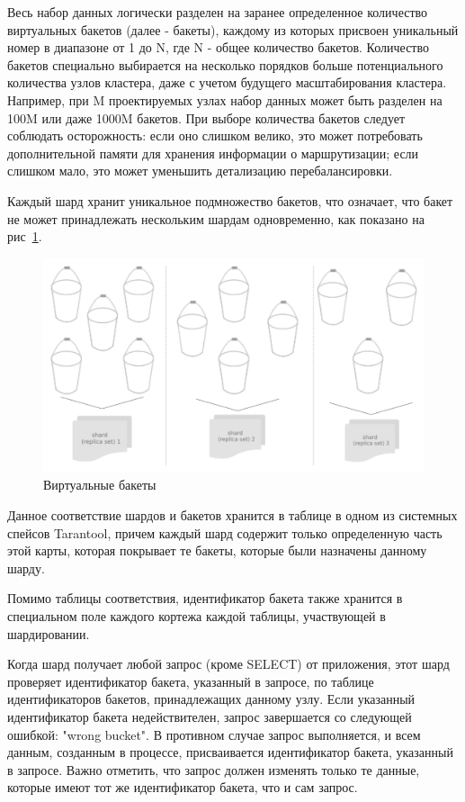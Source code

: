 Весь набор данных логически разделен на заранее определенное количество
виртуальных бакетов (далее - бакеты), каждому из которых присвоен уникальный
номер в диапазоне от 1 до N, где N - общее количество бакетов. Количество
бакетов специально выбирается на несколько порядков больше потенциального
количества узлов кластера, даже с учетом будущего масштабирования кластера.
Например, при M проектируемых узлах набор данных может быть разделен на 100M
или даже 1000M бакетов. При выборе количества бакетов следует соблюдать
осторожность: если оно слишком велико, это может потребовать дополнительной
памяти для хранения информации о маршрутизации; если слишком мало, это может
уменьшить детализацию перебалансировки.

Каждый шард хранит уникальное подмножество бакетов, что означает, что бакет не
может принадлежать нескольким шардам одновременно, как показано на
рис~\ref{fig:fig03}.

\begin{figure}
  \centering
  \includegraphics[scale=0.35]{inc/bucket.svg}
  \caption{Виртуальные бакеты}
  \label{fig:fig03}
\end{figure}

Данное соответствие шардов и бакетов хранится в таблице в одном из системных
спейсов Tarantool, причем каждый шард содержит только определенную часть этой
карты, которая покрывает те бакеты, которые были назначены данному шарду.

Помимо таблицы соответствия, идентификатор бакета также хранится в специальном
поле каждого кортежа каждой таблицы, участвующей в шардировании.

Когда шард получает любой запрос (кроме SELECT) от приложения, этот шард
проверяет идентификатор бакета, указанный в запросе, по таблице идентификаторов
бакетов, принадлежащих данному узлу. Если указанный идентификатор бакета
недействителен, запрос завершается со следующей ошибкой: "wrong bucket". В
противном случае запрос выполняется, и всем данным, созданным в процессе,
присваивается идентификатор бакета, указанный в запросе. Важно отметить, что
запрос должен изменять только те данные, которые имеют тот же идентификатор
бакета, что и сам запрос.

